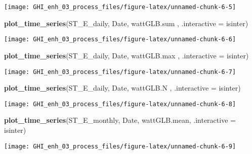 \documentclass[
  10pt,
  a4paper,oneside]{article}
\newenvironment{Shaded}{\begin{snugshade}}{\end{snugshade}}
\newcommand{\AttributeTok}[1]{\textcolor[rgb]{0.13,0.29,0.53}{#1}}
\newcommand{\FunctionTok}[1]{\textcolor[rgb]{0.13,0.29,0.53}{\textbf{#1}}}
\newcommand{\NormalTok}[1]{#1}
\begin{document}
\begin{center}\texttt{[image: GHI\_enh\_03\_process\_files/figure-latex/unnamed-chunk-6-5]} \end{center}

\begin{Shaded}
\begin{Highlighting}[]
\FunctionTok{plot\_time\_series}\NormalTok{(ST\_E\_daily, Date, wattGLB.sum , }\AttributeTok{.interactive =}\NormalTok{ isinter)}
\end{Highlighting}
\end{Shaded}

\begin{center}\texttt{[image: GHI\_enh\_03\_process\_files/figure-latex/unnamed-chunk-6-6]} \end{center}

\begin{Shaded}
\begin{Highlighting}[]
\FunctionTok{plot\_time\_series}\NormalTok{(ST\_E\_daily, Date, wattGLB.max , }\AttributeTok{.interactive =}\NormalTok{ isinter)}
\end{Highlighting}
\end{Shaded}

\begin{center}\texttt{[image: GHI\_enh\_03\_process\_files/figure-latex/unnamed-chunk-6-7]} \end{center}

\begin{Shaded}
\begin{Highlighting}[]
\FunctionTok{plot\_time\_series}\NormalTok{(ST\_E\_daily, Date, wattGLB.N   , }\AttributeTok{.interactive =}\NormalTok{ isinter)}
\end{Highlighting}
\end{Shaded}

\begin{center}\texttt{[image: GHI\_enh\_03\_process\_files/figure-latex/unnamed-chunk-6-8]} \end{center}

\begin{Shaded}
\begin{Highlighting}[]
\FunctionTok{plot\_time\_series}\NormalTok{(ST\_E\_monthly, Date, wattGLB.mean, }\AttributeTok{.interactive =}\NormalTok{ isinter)}
\end{Highlighting}
\end{Shaded}

\begin{center}\texttt{[image: GHI\_enh\_03\_process\_files/figure-latex/unnamed-chunk-6-9]} \end{center}
\end{document}
